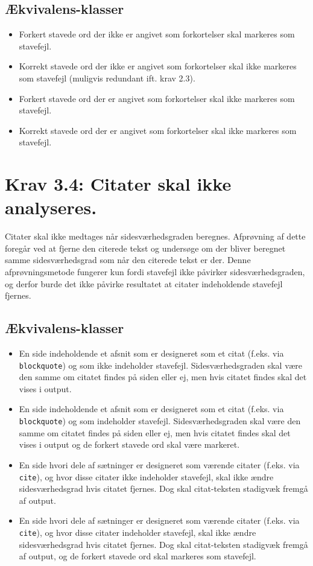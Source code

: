 \documentclass[a4paper,oneside,article, titlepage]{memoir}
\begin{document}
\subsection{Ækvivalens-klasser}
\begin{itemize}
\item Forkert stavede ord der ikke er angivet som forkortelser skal
  markeres som stavefejl.
\item Korrekt stavede ord der ikke er angivet som forkortelser skal
  ikke markeres som stavefejl (muligvis redundant ift. krav 2.3).
\item Forkert stavede ord der er angivet som forkortelser skal ikke
  markeres som stavefejl.
\item Korrekt stavede ord der er angivet som forkortelser skal ikke
  markeres som stavefejl.
\end{itemize}

\section*{Krav 3.4: Citater skal ikke analyseres.}

Citater skal ikke medtages når sidesværhedsgraden beregnes. Afprøvning
af dette foregår ved at fjerne den citerede tekst og undersøge om der
bliver beregnet samme sidesværhedsgrad som når den citerede tekst er
der. Denne afprøvningsmetode fungerer kun fordi stavefejl ikke
påvirker sidesværhedsgraden, og derfor burde det ikke påvirke
resultatet at citater indeholdende stavefejl fjernes.

\subsection{Ækvivalens-klasser}
\begin{itemize}
\item En side indeholdende et afsnit som er designeret som et citat
  (f.eks. via \texttt{blockquote}) og som ikke indeholder
  stavefejl. Sidesværhedsgraden skal være den samme om citatet findes
  på siden eller ej, men hvis citatet findes skal det vises i output.
\item En side indeholdende et afsnit som er designeret som et citat
  (f.eks. via \texttt{blockquote}) og som indeholder
  stavefejl. Sidesværhedsgraden skal være den samme om citatet findes
  på siden eller ej, men hvis citatet findes skal det vises i output
  og de forkert stavede ord skal være markeret.
\item En side hvori dele af sætninger er designeret som værende
  citater (f.eks. via \texttt{cite}), og hvor disse citater ikke
  indeholder stavefejl, skal ikke ændre sidesværhedsgrad hvis citatet
  fjernes. Dog skal citat-teksten stadigvæk fremgå af output.
\item En side hvori dele af sætninger er designeret som værende
  citater (f.eks. via \texttt{cite}), og hvor disse citater indeholder
  stavefejl, skal ikke ændre sidesværhedsgrad hvis citatet
  fjernes. Dog skal citat-teksten stadigvæk fremgå af output, og de
  forkert stavede ord skal markeres som stavefejl.
\end{itemize}
\end{document}
